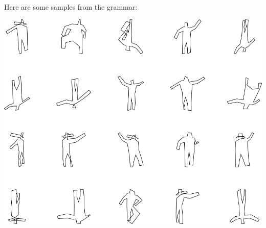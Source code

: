 Here are some samples from the grammar:

\includegraphics[width=6in]{output/3.learning/full_tuning/sdf0_iter30/samples.png}

